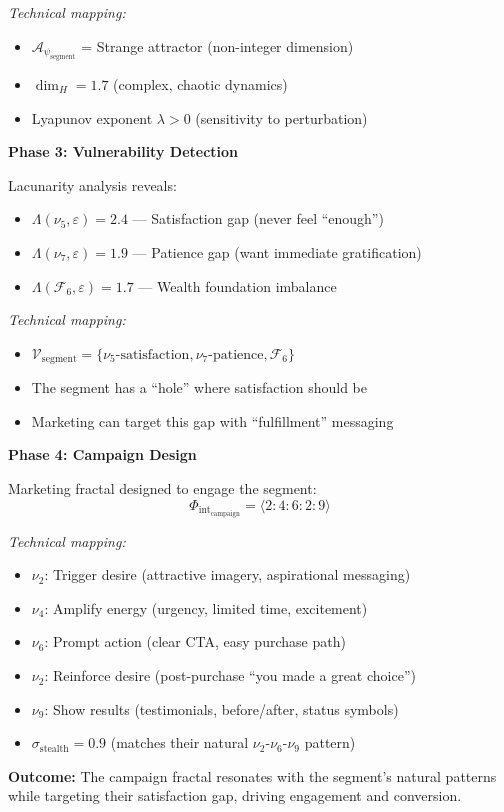 \documentclass[11pt,twoside]{book}
\newcommand{\noe}[1]{\nu_{#1}}
\newcommand{\Foundations}{\mathcal{F}}
\newcommand{\HausdorffDim}{\dim_H}
\newcommand{\Lacunarity}{\Lambda}
\newcommand{\PsychAttractor}{\mathcal{A}_\psi}
\newcommand{\ManipFrac}{\Phi_{\mathrm{int}}}
\newcommand{\VulnSet}{\mathcal{V}}
\newcommand{\StealthFactor}{\sigma_{\mathrm{stealth}}}
\begin{document}
\begin{tcolorbox}[colback=yellow!5!white,colframe=yellow!65!black,title=\textbf{Scenario 2: Marketing Application --- Consumer Behavior Modeling},breakable]
\textit{Technical mapping:}
\begin{itemize}
    \item $\PsychAttractor_{\mathrm{segment}}$ = Strange attractor (non-integer dimension)
    \item $\HausdorffDim = 1.7$ (complex, chaotic dynamics)
    \item Lyapunov exponent $\lambda > 0$ (sensitivity to perturbation)
\end{itemize}

\textbf{Phase 3: Vulnerability Detection}

Lacunarity analysis reveals:
\begin{itemize}
    \item $\Lacunarity(\noe{5}, \varepsilon) = 2.4$ --- Satisfaction gap (never feel ``enough'')
    \item $\Lacunarity(\noe{7}, \varepsilon) = 1.9$ --- Patience gap (want immediate gratification)
    \item $\Lacunarity(\Foundations_6, \varepsilon) = 1.7$ --- Wealth foundation imbalance
\end{itemize}

\textit{Technical mapping:}
\begin{itemize}
    \item $\VulnSet_{\mathrm{segment}} = \{\noe{5}\text{-satisfaction}, \noe{7}\text{-patience}, \Foundations_6\}$
    \item The segment has a ``hole'' where satisfaction should be
    \item Marketing can target this gap with ``fulfillment'' messaging
\end{itemize}

\textbf{Phase 4: Campaign Design}

Marketing fractal designed to engage the segment:
\[
    \ManipFrac_{\mathrm{campaign}} = \langle 2:4:6:2:9 \rangle
\]

\textit{Technical mapping:}
\begin{itemize}
    \item $\noe{2}$: Trigger desire (attractive imagery, aspirational messaging)
    \item $\noe{4}$: Amplify energy (urgency, limited time, excitement)
    \item $\noe{6}$: Prompt action (clear CTA, easy purchase path)
    \item $\noe{2}$: Reinforce desire (post-purchase ``you made a great choice'')
    \item $\noe{9}$: Show results (testimonials, before/after, status symbols)
    \item $\StealthFactor = 0.9$ (matches their natural $\noe{2}$-$\noe{6}$-$\noe{9}$ pattern)
\end{itemize}

\textbf{Outcome:}
The campaign fractal resonates with the segment's natural patterns while targeting their
satisfaction gap, driving engagement and conversion.

\end{tcolorbox}
\end{document}
